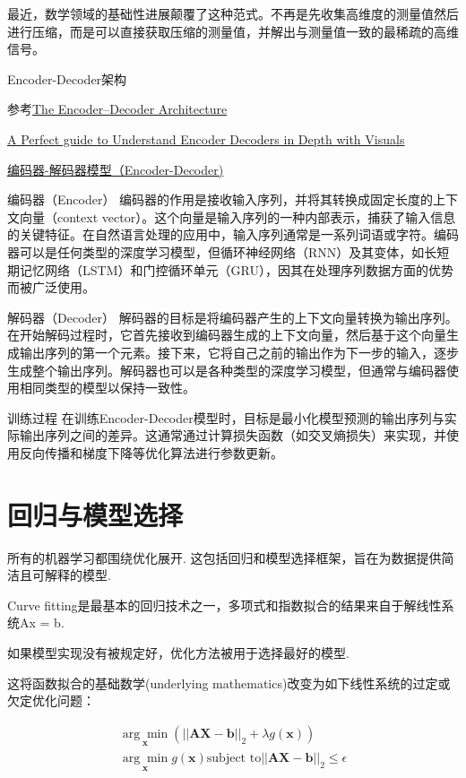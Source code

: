\documentclass{ctexart}
\begin{document}
最近，数学领域的基础性进展颠覆了这种范式。不再是先收集高维度的测量值然后进行压缩，而是可以直接获取压缩的测量值，并解出与测量值一致的最稀疏的高维信号。

Encoder-Decoder架构

参考\href{https://d2l.ai/chapter_recurrent-modern/encoder-decoder.html}{The Encoder–Decoder Architecture} \qquad 

\href{https://medium.com/@ahmadsabry678/a-perfect-guide-to-understand-encoder-decoders-in-depth-with-visuals-30805c23659b#:~:text=An%20encoder%2Ddecoder%20is%20a,to%20generate%20an%20output%20sequence.}{A Perfect guide to Understand Encoder Decoders in Depth with Visuals}

\href{https://zhuanlan.zhihu.com/p/685837791}{编码器-解码器模型（Encoder-Decoder)}

编码器（Encoder）\qquad 
编码器的作用是接收输入序列，并将其转换成固定长度的上下文向量（context vector）。这个向量是输入序列的一种内部表示，捕获了输入信息的关键特征。在自然语言处理的应用中，输入序列通常是一系列词语或字符。编码器可以是任何类型的深度学习模型，但循环神经网络（RNN）及其变体，如长短期记忆网络（LSTM）和门控循环单元（GRU），因其在处理序列数据方面的优势而被广泛使用。

解码器（Decoder）\qquad 
解码器的目标是将编码器产生的上下文向量转换为输出序列。在开始解码过程时，它首先接收到编码器生成的上下文向量，然后基于这个向量生成输出序列的第一个元素。接下来，它将自己之前的输出作为下一步的输入，逐步生成整个输出序列。解码器也可以是各种类型的深度学习模型，但通常与编码器使用相同类型的模型以保持一致性。

训练过程 \qquad 
在训练Encoder-Decoder模型时，目标是最小化模型预测的输出序列与实际输出序列之间的差异。这通常通过计算损失函数（如交叉熵损失）来实现，并使用反向传播和梯度下降等优化算法进行参数更新。


\section{回归与模型选择}


所有的机器学习都围绕优化展开.
这包括回归和模型选择框架，旨在为数据提供简洁且可解释的模型.

Curve fitting是最基本的回归技术之一，多项式和指数拟合的结果来自于解线性系统Ax = b.

如果模型实现没有被规定好，优化方法被用于选择最好的模型.

这将函数拟合的基础数学(underlying mathematics)改变为如下线性系统的过定或欠定优化问题：

\begin{align}
    \underset{\mathbf{x}}{\arg\min} (|| \mathbf{AX-b}||_2 + \lambda g(\mathbf{x})) \\
    \underset{\mathbf{x}}{\arg\min} g(\mathbf{x}) \text{subject to} 
    ||\mathbf{AX-b}||_2 \leq \epsilon
\end{align}
\end{document}
